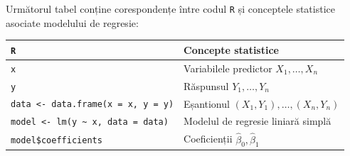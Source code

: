 \documentclass[]{article}
\begin{document}
Următorul tabel conține corespondențe între codul \texttt{R} și
conceptele statistice asociate modelului de regresie:

\begin{longtable}[]{@{}ll@{}}
\toprule
\begin{minipage}[b]{0.49\columnwidth}\raggedright\strut
\texttt{R}\strut
\end{minipage} & \begin{minipage}[b]{0.45\columnwidth}\raggedright\strut
Concepte statistice\strut
\end{minipage}\tabularnewline
\midrule
\endhead
\begin{minipage}[t]{0.49\columnwidth}\raggedright\strut
\texttt{x}\strut
\end{minipage} & \begin{minipage}[t]{0.45\columnwidth}\raggedright\strut
Variabilele predictor \(X_1,\ldots,X_n\)\strut
\end{minipage}\tabularnewline
\begin{minipage}[t]{0.49\columnwidth}\raggedright\strut
\texttt{y}\strut
\end{minipage} & \begin{minipage}[t]{0.45\columnwidth}\raggedright\strut
Răspunsul \(Y_1,\ldots,Y_n\)\strut
\end{minipage}\tabularnewline
\begin{minipage}[t]{0.49\columnwidth}\raggedright\strut
\texttt{data\ \textless{}-\ data.frame(x\ =\ x,\ y\ =\ y)}\strut
\end{minipage} & \begin{minipage}[t]{0.45\columnwidth}\raggedright\strut
Eșantionul \((X_1,Y_1),\ldots,(X_n,Y_n)\)\strut
\end{minipage}\tabularnewline
\begin{minipage}[t]{0.49\columnwidth}\raggedright\strut
\texttt{model\ \textless{}-\ lm(y\ \textasciitilde{}\ x,\ data\ =\ data)}\strut
\end{minipage} & \begin{minipage}[t]{0.45\columnwidth}\raggedright\strut
Modelul de regresie liniară simplă\strut
\end{minipage}\tabularnewline
\begin{minipage}[t]{0.49\columnwidth}\raggedright\strut
\texttt{model\$coefficients}\strut
\end{minipage} & \begin{minipage}[t]{0.45\columnwidth}\raggedright\strut
Coeficienții \(\hat\beta_0,\hat\beta_1\)\strut
\end{minipage}\tabularnewline

\end{longtable}
\end{document}
